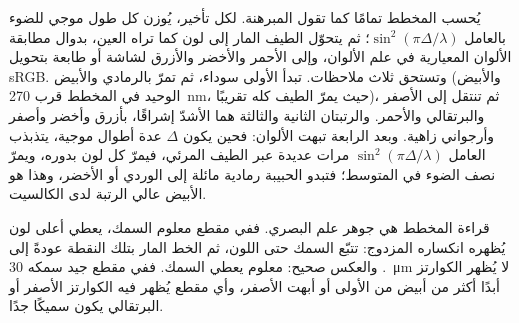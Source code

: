 يُحسب المخطط تمامًا كما تقول المبرهنة. لكل تأخير، يُوزن كل طول موجي للضوء بالعامل $\sin^2(\pi\Delta/\lambda)$؛ ثم يتحوّل الطيف المار إلى لون كما تراه العين، بدوال مطابقة الألوان المعيارية في علم الألوان، وإلى الأحمر والأخضر والأزرق لشاشة أو طابعة بتحويل sRGB. وتستحق ثلاث ملاحظات. تبدأ  الأولى سوداء، ثم تمرّ بالرمادي والأبيض (والأبيض الوحيد في المخطط قرب \qty{270}{nm}، حيث يمرّ الطيف كله تقريبًا)، ثم تنتقل إلى الأصفر والبرتقالي والأحمر. والرتبتان الثانية والثالثة هما الأشدّ إشراقًا، بأزرق وأخضر وأصفر وأرجواني زاهية. وبعد  الرابعة تبهت الألوان: فحين يكون $\Delta$ عدة أطوال موجية، يتذبذب العامل $\sin^2(\pi\Delta/\lambda)$ مرات عديدة عبر الطيف المرئي، فيمرّ كل لون بدوره، ويمرّ نصف الضوء في المتوسط؛ فتبدو الحبيبة رمادية مائلة إلى الوردي أو الأخضر، وهذا هو الأبيض عالي الرتبة لدى الكالسيت.

قراءة المخطط هي جوهر علم  البصري. ففي مقطع معلوم السمك، يعطي أعلى لون يُظهره  انكساره المزدوج: تتبّع السمك حتى اللون، ثم الخط المار بتلك النقطة عودةً إلى . والعكس صحيح:  معلوم  يعطي السمك. ففي مقطع جيد سمكه \qty{30}{\micro m} لا يُظهر الكوارتز أبدًا أكثر من أبيض من  الأولى أو أبهت الأصفر، وأي مقطع يُظهر فيه الكوارتز الأصفر أو البرتقالي يكون سميكًا جدًا.

